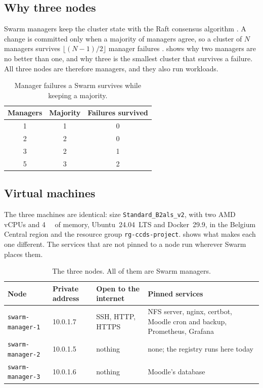 \subsection{Why three nodes}
\label{sec:infra-three}

Swarm managers keep the cluster state with the Raft consensus algorithm
\parencite{ongaro2014raft,llusa2026orchestration}. A change is committed
only when a majority of managers agree, so a cluster of $N$ managers
survives $\lfloor (N-1)/2 \rfloor$ manager failures
\parencite{docker-raft}.  shows why two managers are no
better than one, and why three is the smallest cluster that survives a
failure. All three nodes are therefore managers, and they also run
workloads.

\begin{table}[htbp]
  \centering
  \caption{Manager failures a Swarm survives while keeping a majority.}
  \label{tab:raft}
  \begin{tabular}{ccc}
    \toprule
    Managers & Majority & Failures survived \\
    \midrule
    1 & 1 & 0 \\
    2 & 2 & 0 \\
    3 & 2 & 1 \\
    5 & 3 & 2 \\
    \bottomrule
  \end{tabular}
\end{table}

\subsection{Virtual machines}
\label{sec:infra-vms}

The three machines are identical: size \texttt{Standard\_B2als\_v2},
with two AMD vCPUs and \qty{4}{\gibi\byte} of memory, Ubuntu~24.04~LTS
and Docker~29.9, in the Belgium Central region and the resource group
\texttt{rg-ccds-project}.  shows what makes each one
different. The services that are not pinned to a node run wherever Swarm
places them.

\begin{table}[htbp]
  \centering
  \caption{The three nodes. All of them are Swarm managers.}
  \label{tab:vms}
  \small
  \begin{tabular}{lll>{\raggedright\arraybackslash}p{55mm}}
    \toprule
    Node                     & Private address & Open to the internet & Pinned services \\
    \midrule
    \texttt{swarm-manager-1} & 10.0.1.7 & SSH, HTTP, HTTPS & NFS server, nginx, certbot,
                                                         Moodle cron and backup,
                                                         Prometheus, Grafana \\
    \texttt{swarm-manager-2} & 10.0.1.5 & nothing          & none; the registry runs here today \\
    \texttt{swarm-manager-3} & 10.0.1.6 & nothing          & Moodle's database \\
    \bottomrule
  \end{tabular}
\end{table}

